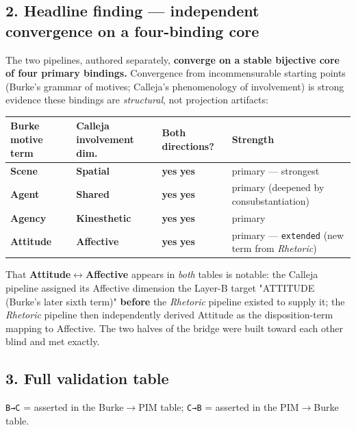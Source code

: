 \documentclass[11pt]{report}
\begin{document}
\subsection{2. Headline finding — independent convergence on a four-binding core}


The two pipelines, authored separately, \textbf{converge on a stable bijective core of four primary bindings.} Convergence from incommensurable starting points (Burke's grammar of motives; Calleja's phenomenology of involvement) is strong evidence these bindings are \textit{structural}, not projection artifacts:


\begin{table}[H]
\small
\renewcommand{\arraystretch}{1.25}
\begin{tabularx}{\textwidth}{>{\RaggedRight\arraybackslash}X>{\RaggedRight\arraybackslash}X>{\RaggedRight\arraybackslash}X>{\RaggedRight\arraybackslash}X}
\toprule
Burke motive term & Calleja involvement dim. & Both directions? & Strength \\
\midrule
\textbf{Scene} & \textbf{Spatial} & \textbf{yes} \textbf{yes} & primary — strongest \\
\textbf{Agent} & \textbf{Shared} & \textbf{yes} \textbf{yes} & primary (deepened by consubstantiation) \\
\textbf{Agency} & \textbf{Kinesthetic} & \textbf{yes} \textbf{yes} & primary \\
\textbf{Attitude} & \textbf{Affective} & \textbf{yes} \textbf{yes} & primary — \texttt{extended} (new term from \textit{Rhetoric}) \\
\bottomrule
\end{tabularx}
\end{table}


That \textbf{Attitude$\leftrightarrow$\allowbreak Affective} appears in \textit{both} tables is notable: the Calleja pipeline assigned its Affective dimension the Layer-B target "ATTITUDE (Burke's later sixth term)" \textbf{before} the \textit{Rhetoric} pipeline existed to supply it; the \textit{Rhetoric} pipeline then independently derived Attitude as the disposition-term mapping to Affective. The two halves of the bridge were built toward each other blind and met exactly.


\subsection{3. Full validation table}


\texttt{B→C} = asserted in the Burke$\rightarrow$\allowbreak PIM table; \texttt{C→B} = asserted in the PIM$\rightarrow$\allowbreak Burke table.
\end{document}
